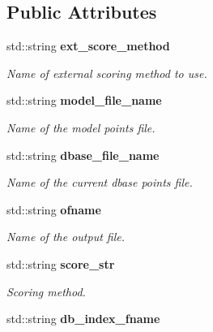 \subsection*{Public Attributes}
\begin{CompactItemize}
\item 
std::string \bf{ext\_\-score\_\-method}\label{classASCbase_1_1SearchParameters_31b913ee478296612756c9b25b34465d}

\begin{CompactList}\small\item\em Name of external scoring method to use. \item\end{CompactList}\item 
std::string \bf{model\_\-file\_\-name}\label{classASCbase_1_1SearchParameters_cdcb30f0c043a4137ed8c790502ada62}

\begin{CompactList}\small\item\em Name of the model points file. \item\end{CompactList}\item 
std::string \bf{dbase\_\-file\_\-name}\label{classASCbase_1_1SearchParameters_c70448bc467a512efafbf3b952770550}

\begin{CompactList}\small\item\em Name of the current dbase points file. \item\end{CompactList}\item 
std::string \bf{ofname}\label{classASCbase_1_1SearchParameters_51c7063e6085b9aa32527a64206ecfdc}

\begin{CompactList}\small\item\em Name of the output file. \item\end{CompactList}\item 
std::string \bf{score\_\-str}\label{classASCbase_1_1SearchParameters_770e3c6ff6ae15a21330d15dcfe3d4d5}

\begin{CompactList}\small\item\em Scoring method. \item\end{CompactList}\item 
std::string \bf{db\_\-index\_\-fname}\label{classASCbase_1_1SearchParameters_48d9df89d360efd9b57b8917aae33712}


\end{CompactItemize}
